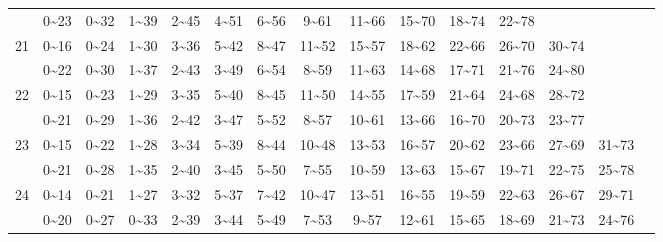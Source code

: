 \documentclass[lang=cn,10pt]{elegantbook}
\begin{document}
\begin{longtable}{c|cccccccccccccc}
       & 0\textasciitilde23 & 0\textasciitilde32 & 1\textasciitilde39 & 2\textasciitilde45 & 4\textasciitilde51 & 6\textasciitilde56 & 9\textasciitilde61 & 11\textasciitilde66 & 15\textasciitilde70 & 18\textasciitilde74 & 22\textasciitilde78 & & & \\
    21 & 0\textasciitilde16 & 0\textasciitilde24 & 1\textasciitilde30 & 3\textasciitilde36 & 5\textasciitilde42 & 8\textasciitilde47 & 11\textasciitilde52 & 15\textasciitilde57 & 18\textasciitilde62 & 22\textasciitilde66 & 26\textasciitilde70 & 30\textasciitilde74 & & \\
       & 0\textasciitilde22 & 0\textasciitilde30 & 1\textasciitilde37 & 2\textasciitilde43 & 3\textasciitilde49 & 6\textasciitilde54 & 8\textasciitilde59 & 11\textasciitilde63 & 14\textasciitilde68 & 17\textasciitilde71 & 21\textasciitilde76 & 24\textasciitilde80 & & \\
    22 & 0\textasciitilde15 & 0\textasciitilde23 & 1\textasciitilde29 & 3\textasciitilde35 & 5\textasciitilde40 & 8\textasciitilde45 & 11\textasciitilde50 & 14\textasciitilde55 & 17\textasciitilde59 & 21\textasciitilde64 & 24\textasciitilde68 & 28\textasciitilde72 & & \\
       & 0\textasciitilde21 & 0\textasciitilde29 & 1\textasciitilde36 & 2\textasciitilde42 & 3\textasciitilde47 & 5\textasciitilde52 & 8\textasciitilde57 & 10\textasciitilde61 & 13\textasciitilde66 & 16\textasciitilde70 & 20\textasciitilde73 & 23\textasciitilde77 & & \\
    23 & 0\textasciitilde15 & 0\textasciitilde22 & 1\textasciitilde28 & 3\textasciitilde34 & 5\textasciitilde39 & 8\textasciitilde44 & 10\textasciitilde48 & 13\textasciitilde53 & 16\textasciitilde57 & 20\textasciitilde62 & 23\textasciitilde66 & 27\textasciitilde69 & 31\textasciitilde73 & \\
       & 0\textasciitilde21 & 0\textasciitilde28 & 1\textasciitilde35 & 2\textasciitilde40 & 3\textasciitilde45 & 5\textasciitilde50 & 7\textasciitilde55 & 10\textasciitilde59 & 13\textasciitilde63 & 15\textasciitilde67 & 19\textasciitilde71 & 22\textasciitilde75 & 25\textasciitilde78 & \\
    24 & 0\textasciitilde14 & 0\textasciitilde21 & 1\textasciitilde27 & 3\textasciitilde32 & 5\textasciitilde37 & 7\textasciitilde42 & 10\textasciitilde47 & 13\textasciitilde51 & 16\textasciitilde55 & 19\textasciitilde59 & 22\textasciitilde63 & 26\textasciitilde67 & 29\textasciitilde71 & \\
       & 0\textasciitilde20 & 0\textasciitilde27 & 0\textasciitilde33 & 2\textasciitilde39 & 3\textasciitilde44 & 5\textasciitilde49 & 7\textasciitilde53 & 9\textasciitilde57 & 12\textasciitilde61 & 15\textasciitilde65 & 18\textasciitilde69 & 21\textasciitilde73 & 24\textasciitilde76 & \\

\end{longtable}
\end{document}
